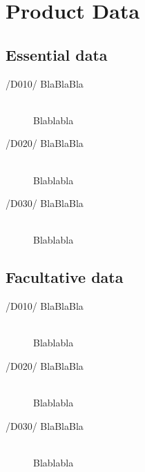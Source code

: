\section{Product Data}

\subsection{Essential data}
\begin{description}
\item[/D010/ BlaBlaBla]\hfill \\ Blablabla
\item[/D020/ BlaBlaBla]\hfill \\ Blablabla
\item[/D030/ BlaBlaBla]\hfill \\ Blablabla
\end{description}

\subsection{Facultative data}
\begin{description}
\item[/D010/ BlaBlaBla]\hfill \\ Blablabla
\item[/D020/ BlaBlaBla]\hfill \\ Blablabla
\item[/D030/ BlaBlaBla]\hfill \\ Blablabla
\end{description}
